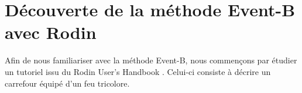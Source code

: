 \chapter{Découverte de la méthode Event-B avec Rodin}

Afin de nous familiariser avec la méthode Event-B, nous commençons par étudier un tutoriel issu du Rodin User's Handbook \cite{rodinuserhandbook}.
Celui-ci consiste à décrire un carrefour équipé d'un feu tricolore.

